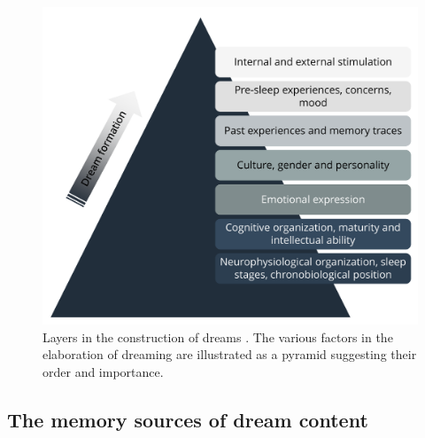 \begin{figure}[htb]
	\includegraphics[width=\textwidth]{Fig/Introduction/Intro_Pyramid_dream_construction/Intro_pyramid_dream.png}
	\caption{Layers in the construction of dreams \citep{de_koninck_sleep_2012}. The various factors in the elaboration of dreaming are illustrated as a pyramid suggesting their order and importance.}
	\label{fig:intro:koninck}
\end{figure}

\subsection{The memory sources of dream content}
\label{sec:dream-content:sources:memory}

